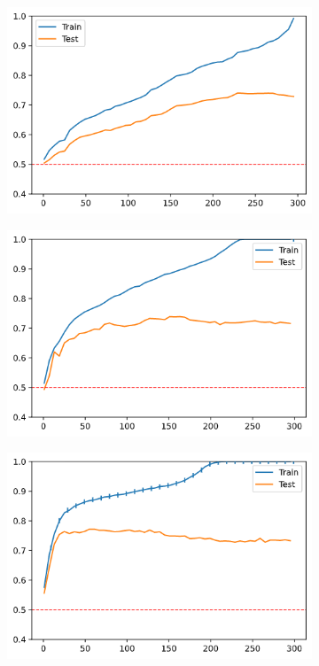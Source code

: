 \begin{figure}[H]
    \centering
    \begin{subfigure}[b]{0.4\linewidth}
        \includegraphics[width=\linewidth]{img/vanilla300-random.png}
    \end{subfigure}
    \begin{subfigure}[b]{0.4\linewidth}
        \includegraphics[width=\linewidth]{img/vanilla300-svmrfe-s300.png}
    \end{subfigure}
    \begin{subfigure}[b]{0.4\linewidth}
        \includegraphics[width=\linewidth]{img/vanilla300-svmrfe-s10.png}

\end{subfigure}
\end{figure}
